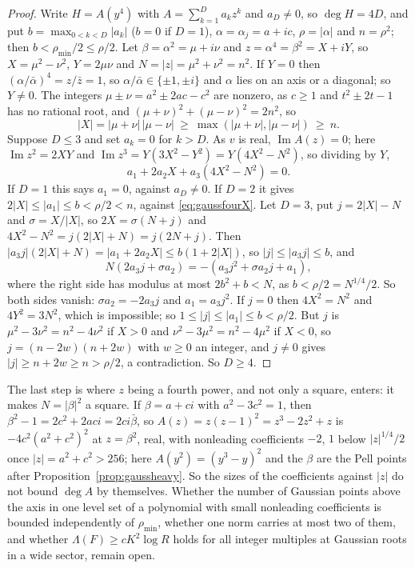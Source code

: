 \documentclass[11pt]{article}
\begin{document}
\begin{proof}
Write $H=A(y^4)$ with $A=\sum_{k=1}^Da_kz^k$ and $a_D\ne0$, so
$\deg H=4D$, and put $b=\max_{0<k<D}|a_k|$ ($b=0$ if $D=1$), $\alpha=\alpha_j=a+ic$,
$\rho=|\alpha|$ and $n=\rho^2$; then $b<\rho_{\min}/2\le\rho/2$.  Let
$\beta=\alpha^2=\mu+i\nu$ and $z=\alpha^4=\beta^2=X+iY$, so
$X=\mu^2-\nu^2$, $Y=2\mu\nu$ and $N=|z|=\mu^2+\nu^2=n^2$.  If $Y=0$ then
$(\alpha/\bar\alpha)^4=z/\bar z=1$, so $\alpha/\bar\alpha\in\{\pm1,\pm i\}$
and $\alpha$ lies on an axis or a diagonal; so $Y\ne0$.  The integers
$\mu\pm\nu=a^2\pm2ac-c^2$ are nonzero, as $c\ge1$ and $t^2\pm2t-1$ has no
rational root, and $(\mu+\nu)^2+(\mu-\nu)^2=2n^2$, so
\begin{equation}\label{eq:gaussfourX}
  |X|=|\mu+\nu|\,|\mu-\nu|\ \ge\ \max(|\mu+\nu|,|\mu-\nu|)\ \ge\ n .
\end{equation}
Suppose $D\le3$ and set $a_k=0$ for $k>D$.  As $v$ is real,
$\operatorname{Im}A(z)=0$; here $\operatorname{Im}z^2=2XY$ and
$\operatorname{Im}z^3=Y(3X^2-Y^2)=Y(4X^2-N^2)$, so dividing by $Y$,
\[
  a_1+2a_2X+a_3(4X^2-N^2)=0 .
\]
If $D=1$ this says $a_1=0$, against $a_D\ne0$.  If $D=2$ it gives $2|X|\le|a_1|\le b<\rho/2<n$,
against \eqref{eq:gaussfourX}.  Let $D=3$, put $j=2|X|-N$ and
$\sigma=X/|X|$, so $2X=\sigma(N+j)$ and
$4X^2-N^2=j(2|X|+N)=j(2N+j)$.  Then
$|a_3j|(2|X|+N)=|a_1+2a_2X|\le b(1+2|X|)$, so $|j|\le|a_3j|\le b$, and
\[
  N(2a_3j+\sigma a_2)=-(a_3j^2+\sigma a_2j+a_1),
\]
where the right side has modulus at most $2b^2+b<N$, as $b<\rho/2=N^{1/4}/2$.
So both sides vanish: $\sigma a_2=-2a_3j$ and $a_1=a_3j^2$.  If $j=0$ then
$4X^2=N^2$ and $4Y^2=3N^2$, which is impossible; so $1\le|j|\le|a_1|\le
b<\rho/2$.  But $j$ is $\mu^2-3\nu^2=n^2-4\nu^2$ if $X>0$ and
$\nu^2-3\mu^2=n^2-4\mu^2$ if $X<0$, so $j=(n-2w)(n+2w)$ with $w\ge0$ an
integer, and $j\ne0$ gives $|j|\ge n+2w\ge n>\rho/2$, a contradiction.  So
$D\ge4$.
\end{proof}

The last step is where $z$ being a fourth power, and not only a square,
enters: it makes $N=|\beta|^2$ a square.  If $\beta=a+ci$ with $a^2-3c^2=1$,
then $\beta^2-1=2c^2+2aci=2ci\bar\beta$, so $A(z)=z(z-1)^2=z^3-2z^2+z$ is
$-4c^2(a^2+c^2)^2$ at $z=\beta^2$, real, with nonleading coefficients $-2$,
$1$ below $|z|^{1/4}/2$ once $|z|=a^2+c^2>256$; here $A(y^2)=(y^3-y)^2$ and
the $\beta$ are the Pell points after Proposition~\ref{prop:gaussheavy}.  So
the sizes of the coefficients against $|z|$ do not bound $\deg A$ by
themselves.  Whether the number of Gaussian points above the axis in
one level set of a polynomial with small nonleading coefficients is bounded
independently of $\rho_{\min}$, whether one norm carries at most two of
them, and whether $\Lambda(F)\ge cK^2\log R$ holds for all integer
multiples at Gaussian roots in a wide sector, remain open.
\end{document}
